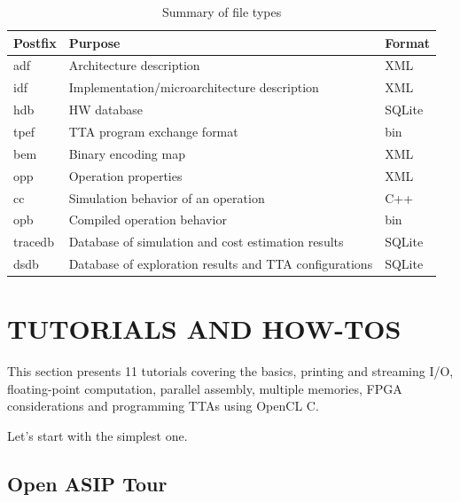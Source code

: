 \documentclass[a4paper,twoside]{tceusermanual}
\begin{document}
\begin{table}[b]
  \begin{center}
    \caption {Summary of file types}
    \label {tab:files}
    \begin{tabular}{l | l | l }
      \hline
      Postfix  & Purpose                                    & Format \\
      \hline
      \hline
      adf      & Architecture description                 & XML \\
      idf      & Implementation/microarchitecture description & XML \\
      hdb      & HW database                                & SQLite \\
      \hline
      tpef     & TTA program exchange format                & bin \\
      bem      & Binary encoding map                        & XML \\
      opp      & Operation properties                       & XML \\
      cc       & Simulation behavior of an operation                   & C++\\
      opb      & Compiled operation behavior                & bin \\
      \hline
      tracedb  & Database of simulation and cost estimation results     & SQLite \\
      dsdb     & Database of exploration results and TTA configurations & SQLite \\
      \hline
    \end{tabular}
  \end{center}
\end{table}


\chapter{TUTORIALS AND HOW-TOS}
\label{chapter:tutorials}

This section presents 11 tutorials covering the basics, printing and
streaming I/O, floating-point computation, parallel assembly, multiple
memories, FPGA considerations and programming TTAs using OpenCL C.

Let's start with the simplest one.

\section{Open ASIP Tour}
\label{sec:tcetour}
\end{document}
